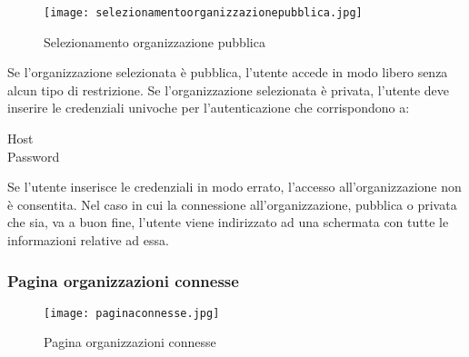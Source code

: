 \documentclass[../manuale-utente.tex]{subfiles}
\begin{document}
 \begin{figure}[H]
   \centering
   \texttt{[image: selezionamentoorganizzazionepubblica.jpg]}
   \caption{Selezionamento organizzazione pubblica}%
   \label{fig:mobile_app_selezionamento_organizzazione_pubblica}
 \end{figure}
Se l'organizzazione selezionata è pubblica, l'utente accede in modo libero senza alcun tipo di restrizione.
Se l'organizzazione selezionata è privata, l'utente deve inserire le credenziali univoche per l'autenticazione  che corrispondono a:
\begin{description}
  \item[Host] %
  \item[Password] %
\end{description}
Se l'utente inserisce le credenziali in modo errato, l'accesso all'organizzazione non è consentita.
Nel caso in cui la connessione all'organizzazione, pubblica o privata che sia, va a buon fine, l'utente viene indirizzato ad una schermata con tutte le informazioni relative ad essa.

\subsubsection{Pagina organizzazioni connesse}%
\label{subs:pagina_organizzazioni_connesse}

 \begin{figure}[H]
   \centering
   \texttt{[image: paginaconnesse.jpg]}
   \caption{Pagina organizzazioni connesse}%
   \label{fig:mobile_app_pagina_organizzazioni_connesse}
 \end{figure}
\end{document}
